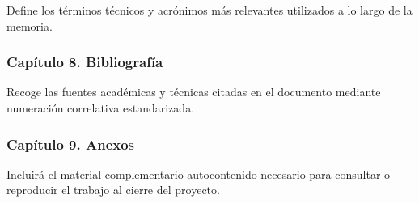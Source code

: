 Define los términos técnicos y acrónimos más relevantes utilizados a lo largo de la memoria.

\subsubsection{Capítulo 8. Bibliografía}

Recoge las fuentes académicas y técnicas citadas en el documento mediante numeración correlativa estandarizada.

\subsubsection{Capítulo 9. Anexos}

Incluirá el material complementario autocontenido necesario para consultar o reproducir el trabajo al cierre del proyecto.
